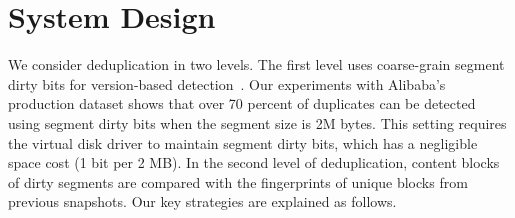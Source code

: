 \section{System Design}
\label{sect:arch}





We consider deduplication in two levels. The first level
uses coarse-grain segment  dirty bits for version-based detection~\cite{Clements2009,Vrable2009}.
Our experiments with Alibaba's production dataset shows that over 70 percent of 
duplicates can be detected using segment dirty bits when the segment size is 2M bytes.  
This setting requires the virtual disk driver to maintain segment dirty bits,
which has a negligible space cost (1 bit per 2 MB). In the second level of deduplication, content blocks of dirty segments 
are compared with the fingerprints of unique  blocks from previous snapshots.
Our key strategies are explained as follows.
